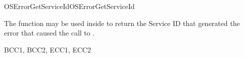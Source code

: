 
\begin{function_nopb2}{OSErrorGetServiceId}{OSErrorGetServiceId}
  \begin{fundescription}
    The function may be used inside  to return the
    Service ID that generated the error that caused the call to
    .
  \end{fundescription}
  \begin{funreturn}
  \end{funreturn}
  \begin{funconformance}
    BCC1, BCC2, ECC1, ECC2
  \end{funconformance}
\end{function_nopb2}


